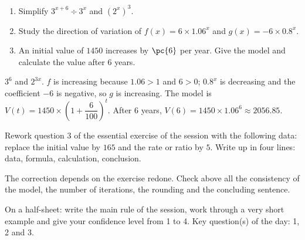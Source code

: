 \begin{exercise}[essential]
\begin{enumerate}\item Simplify $3^{x+6}\div3^x$ and $(2^x)^3$.\item Study the direction of variation of $f(x)=6\times\num{1,06}^x$ and $g(x)=-6\times\num{0,8}^x$.\item An initial value of $1450$ increases by $\pc{6}$ per year. Give the model and calculate the value after $6$ years.\end{enumerate}
\end{exercise}
\begin{solution}$3^6$ and $2^{3x}$. $f$ is increasing because $\num{1,06}>1$ and $6>0$; $\num{0,8}^x$ is decreasing and the coefficient $-6$ is negative, so $g$ is increasing. The model is $V(t)=1450\times\left(1+\dfrac{6}{100}\right)^t$. After $6$ years, $V(6)=1450\times\num{1,06}^6\approx\num{2056,85}$.\end{solution}


\begin{homework}Rework question 3 of the essential exercise of the session with the following data: replace the initial value by $165$ and the rate or ratio by $5$. Write up in four lines: data, formula, calculation, conclusion.\end{homework}
\begin{solution}The correction depends on the exercise redone. Check above all the consistency of the model, the number of iterations, the rounding and the concluding sentence.\end{solution}

\begin{exitticket}[3 minutes]On a half-sheet: write the main rule of the session, work through a very short example and give your confidence level from 1 to 4. Key question(s) of the day: 1, 2 and 3.\end{exitticket}

